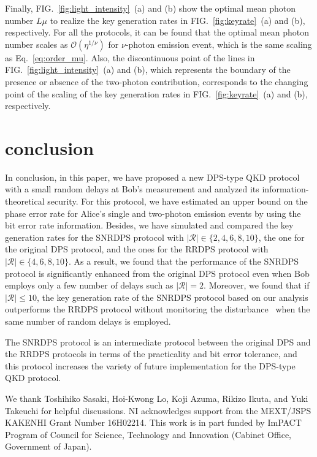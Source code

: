 \documentclass[twocolumn,superscriptaddress,pra,footinbib,notitlepage]{revtex4-1}
\newcommand{\1}{\mbox{1}\hspace{-0.25em}\mbox{l}}
\newcommand{\abs}[1]{\lvert#1\rvert}
\begin{document}
Finally, FIG.~\ref{fig:light_intensity}~(a) and (b) show the optimal mean photon number $L\mu$ to realize the key generation rates in FIG.~\ref{fig:keyrate}~(a) and (b), respectively.
For all the protocols, it can be found that the optimal mean photon number scales as $\mathcal{O}(\eta^{1/\nu})$ for $\nu$-photon emission event, which is the same scaling as Eq.~\eqref{eq:order_mu}.
Also, the discontinuous point of the lines in FIG.~\ref{fig:light_intensity}~(a) and (b), which represents the boundary of the presence or absence of the two-photon contribution, corresponds to the changing point of the scaling of the key generation rates in FIG.~\ref{fig:keyrate}~(a) and (b), respectively.

\section{conclusion}
\label{sec:conclusion}
In conclusion, in this paper, we have proposed a new DPS-type QKD protocol with a small random delays at Bob's measurement and analyzed its information-theoretical security.
For this protocol, we have estimated an upper bound on the phase error rate for Alice's single and two-photon emission events by using the bit error rate information.
Besides, we have simulated and compared the key generation rates for the SNRDPS protocol with $\abs{\mathcal{R}}\in\{2,4,6,8,10\}$, the one for the original DPS protocol, and the ones for the RRDPS protocol with $\abs{\mathcal{R}}\in\{4,6,8,10\}$.
As a result, we found that the performance of the SNRDPS protocol is significantly enhanced from the original DPS protocol even when Bob employs only a few number of delays such as $\abs{\mathcal{R}}=2$.
Moreover, we found that if $\abs{\mathcal{R}}\leq 10$, the key generation rate of the SNRDPS protocol based on our analysis outperforms the RRDPS protocol without monitoring the disturbance~\cite{sasaki2014practical} when the same number of random delays is employed.

The SNRDPS protocol is an intermediate protocol between the original DPS and the RRDPS protocols in terms of the practicality and bit error tolerance, and this protocol increases the variety of future implementation for the DPS-type QKD protocol.

\acknowledgments
We thank Toshihiko Sasaki, Hoi-Kwong Lo, Koji Azuma, Rikizo Ikuta, and Yuki Takeuchi for helpful discussions. 
NI acknowledges support from the MEXT/JSPS KAKENHI Grant Number 16H02214.
This work is in part funded by ImPACT Program of Council for Science, Technology and Innovation (Cabinet Office, Government of Japan).
\end{document}
